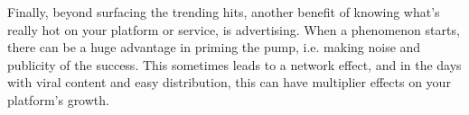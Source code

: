 \vspace{10pt}
Finally, beyond surfacing the trending hits, another benefit of knowing what's really hot on your platform or service, is advertising. When a phenomenon starts, there can be a huge advantage in priming the pump, i.e. making noise and publicity of the success. This sometimes leads to a network effect, and in the days with viral content and easy distribution, this can have multiplier effects on your platform's growth.